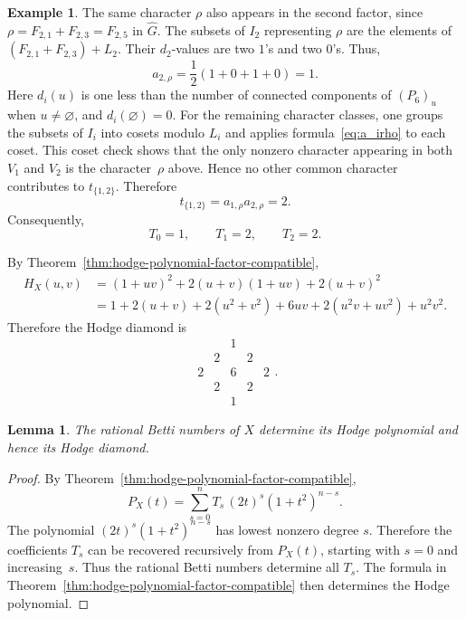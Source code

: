 \documentclass{amsart}
\newtheorem{lemma}[theorem]{Lemma}
\numberwithin{equation}{section}
\theoremstyle{definition}
\newtheorem{example}[theorem]{Example}
\theoremstyle{remark}
\begin{document}
\begin{example}
    The same character $\rho$ also appears in the second factor, since $\rho=F_{2,1}+F_{2,3}=F_{2,5}$ in $\widehat G$.
    The subsets of $I_2$ representing $\rho$ are the elements of $(F_{2,1}+F_{2,3})+L_2$.
    Their $d_2$-values are two $1$'s and two $0$'s.
    Thus,
    $$
        a_{2,\rho}=\frac12(1+0+1+0)=1.
    $$
    Here $d_i(u)$ is one less than the number of connected components of $(P_6)_u$ when $u\ne\varnothing$, and $d_i(\varnothing)=0$.
    For the remaining character classes, one groups the subsets of $I_i$ into cosets modulo $L_i$ and applies formula~\eqref{eq:a_irho} to each coset.
    This coset check shows that the only nonzero character appearing in both $V_1$ and $V_2$ is the character~$\rho$ above.
    Hence no other common character contributes to $t_{\{1,2\}}$.
    Therefore
    $$
        t_{\{1,2\}} = a_{1,\rho}a_{2,\rho} = 2.
    $$
    Consequently,
    $$
        T_0=1,\qquad T_1=2,\qquad T_2=2.
    $$
    
    By Theorem~\ref{thm:hodge-polynomial-factor-compatible},
    \begin{align*}
        H_X(u,v) &= (1+uv)^2 + 2(u+v)(1+uv) + 2(u+v)^2 \\
            &= 1+2(u+v)+2(u^2+v^2)+6uv + 2(u^2v+uv^2)+u^2v^2.  
    \end{align*}
    Therefore the Hodge diamond is
    $$
        \begin{array}{ccccc}
        &&1&&\\
        &2&&2&\\
        2&&6&&2\\
        &2&&2&\\
        &&1&&
        \end{array}.
    $$
\end{example}

\begin{lemma}\label{lem:betti-determine-hodge}
The rational Betti numbers of $X$ determine its Hodge polynomial and hence its Hodge diamond.
\end{lemma}
\begin{proof}
By Theorem~\ref{thm:hodge-polynomial-factor-compatible},
    $$
        P_X(t)=\sum_{s=0}^n T_s\,(2t)^s(1+t^2)^{n-s}.
    $$
The polynomial $(2t)^s(1+t^2)^{n-s}$ has lowest nonzero degree $s$.
Therefore the coefficients $T_s$ can be recovered recursively from $P_X(t)$, starting with $s=0$ and increasing~$s$.
Thus the rational Betti numbers determine all $T_s$.
The formula in Theorem~\ref{thm:hodge-polynomial-factor-compatible} then determines the Hodge polynomial.
    \end{proof}
\end{document}
